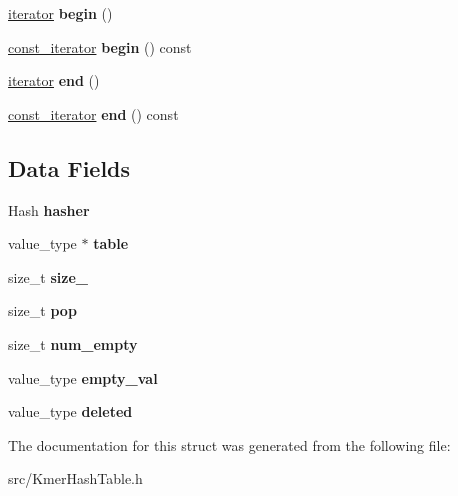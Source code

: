 \begin{DoxyCompactItemize}
\item 
\mbox{\label{structKmerHashTable_a53612ad3658ea71661036df375118b59}} 
\hyperlink{classKmerHashTable_1_1iterator__}{iterator} {\bfseries begin} ()
\item 
\mbox{\label{structKmerHashTable_ada3cff8897669a4065734981bde58a05}} 
\hyperlink{classKmerHashTable_1_1iterator__}{const\+\_\+iterator} {\bfseries begin} () const
\item 
\mbox{\label{structKmerHashTable_a3b3553028fad26d25558fa21eaf680ba}} 
\hyperlink{classKmerHashTable_1_1iterator__}{iterator} {\bfseries end} ()
\item 
\mbox{\label{structKmerHashTable_ad86e572b7d7d39c8fbf95013e773858f}} 
\hyperlink{classKmerHashTable_1_1iterator__}{const\+\_\+iterator} {\bfseries end} () const
\end{DoxyCompactItemize}
\subsection*{Data Fields}
\begin{DoxyCompactItemize}
\item 
\mbox{\label{structKmerHashTable_a80eff63ddffbf7601d50c292f4a71dd7}} 
Hash {\bfseries hasher}
\item 
\mbox{\label{structKmerHashTable_acbd042dd4be3238b9633cf8cf18f820c}} 
value\+\_\+type $\ast$ {\bfseries table}
\item 
\mbox{\label{structKmerHashTable_a613ff0d86fc959a0baf0880bf380a518}} 
size\+\_\+t {\bfseries size\+\_\+}
\item 
\mbox{\label{structKmerHashTable_a7da0365c66fff1faa6e2e9e897a62c74}} 
size\+\_\+t {\bfseries pop}
\item 
\mbox{\label{structKmerHashTable_a45b71606973dca26b7afc4e5bec51472}} 
size\+\_\+t {\bfseries num\+\_\+empty}
\item 
\mbox{\label{structKmerHashTable_aa7fe6b57fcff4b58c56ca6c1d4ec5e55}} 
value\+\_\+type {\bfseries empty\+\_\+val}
\item 
\mbox{\label{structKmerHashTable_a64dc2d2a59b3d935945d24eb41435966}} 
value\+\_\+type {\bfseries deleted}
\end{DoxyCompactItemize}


The documentation for this struct was generated from the following file\+:\begin{DoxyCompactItemize}
\item 
src/Kmer\+Hash\+Table.\+h\end{DoxyCompactItemize}
